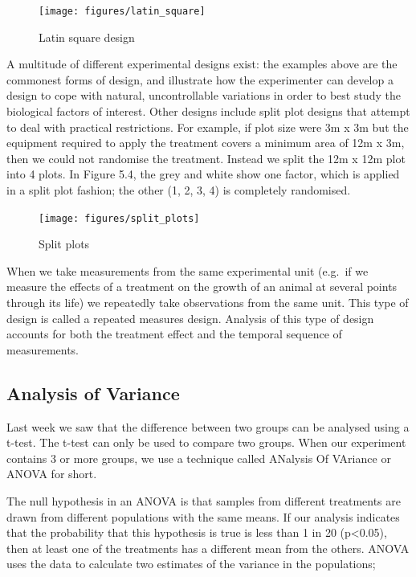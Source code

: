 \documentclass[
]{book}
\begin{document}
\begin{figure}
\texttt{[image: figures/latin\_square]} \caption{Latin square design}\label{fig:unnamed-chunk-45}
\end{figure}

A multitude of different experimental designs exist: the examples above are the commonest forms of design, and illustrate how the experimenter can develop a design to cope with natural, uncontrollable variations in order to best study the biological factors of interest. Other designs include split plot designs that attempt to deal with practical restrictions. For example, if plot size were 3m x 3m but the equipment required to apply the treatment covers a minimum area of 12m x 3m, then we could not randomise the treatment. Instead we split the 12m x 12m plot into 4 plots. In Figure 5.4, the grey and white show one factor, which is applied in a split plot fashion; the other (1, 2, 3, 4) is completely randomised.

\begin{figure}
\texttt{[image: figures/split\_plots]} \caption{Split plots}\label{fig:unnamed-chunk-46}
\end{figure}

When we take measurements from the same experimental unit (e.g.~if we measure the effects of a treatment on the growth of an animal at several points through its life) we repeatedly take observations from the same unit. This type of design is called a repeated measures design. Analysis of this type of design accounts for both the treatment effect and the temporal sequence of measurements.

\hypertarget{analysis-of-variance}{%
\subsection*{Analysis of Variance}\label{analysis-of-variance}}

Last week we saw that the difference between two groups can be analysed using a t-test. The t-test can only be used to compare two groups. When our experiment contains 3 or more groups, we use a technique called ANalysis Of VAriance or ANOVA for short.

The null hypothesis in an ANOVA is that samples from different treatments are drawn from different populations with the same means. If our analysis indicates that the probability that this hypothesis is true is less than 1 in 20 (p\textless0.05), then at least one of the treatments has a different mean from the others. ANOVA uses the data to calculate two estimates of the variance in the populations;
\end{document}
